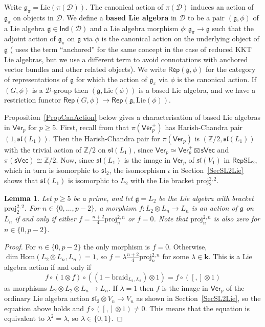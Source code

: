 \documentclass[11pt,a4paper,reqno]{amsart}
\newtheorem{lemma}[theorem]{Lemma}
\theoremstyle{definition}
\newcommand{\bk}{\mathbf{k}}
\newcommand{\cD}{\mathcal{D}}
\numberwithin{equation}{section}
\newcommand{\braid}{\mathrm{braid}}
\newcommand{\Ver}{\mathsf{Ver}}
\newcommand{\Rep}{\mathsf{Rep}}
\newcommand{\mZ}{\mathbb{Z}}
\newcommand{\fg}{\mathfrak{g}}
\newcommand{\fsl}{\mathfrak{sl}}
\newcommand{\Hom}{\mathrm{Hom}}
\newcommand{\Lie}{\mathrm{Lie}}
\newcommand{\sVec}{\mathsf{sVec}}
\newcommand{\Indd}{\mathsf{Ind}}
\newcommand{\SL}{\mathrm{SL}}
\newcommand{\proj}{\mathrm{proj}}
\begin{document}
Write $\fg_\pi=\Lie(\pi(\cD))$. The canonical action of $\pi(\cD)$ induces an action of $\fg_\pi$ on objects in $\cD$. We define a \textbf{based Lie algebra} in $\cD$ to be a pair $(\fg,\phi)$ of a Lie algebra $\fg\in\Indd(\cD)$ and a Lie algebra morphism $\phi:\fg_\pi\to\fg$ such that the adjoint action of $\fg_\pi$ on $\fg$ via $\phi$ is the canonical action on the underlying object of $\fg$ (\cite{EKO} uses the term ``anchored'' for the same concept in the case of reduced KKT Lie algebras, but we use a different term to avoid connotations with anchored vector bundles and other related objects). We write $\Rep(\fg,\phi)$ for the category of representations of $\fg$ for which the action of $\fg_\pi$ via $\phi$ is the canonical action. If $(G,\phi)$ is a $\cD$-group then $(\fg,\Lie(\phi))$ is a based Lie algebra, and we have a restriction functor $\Rep(G,\phi)\to\Rep(\fg,\Lie(\phi))$.

Proposition~\ref{PropCanAction} below gives a characterisation of based Lie algebras in $\Ver_p$ for $p\geq5$. First, recall from \cite[Theorem~4.9]{Ve2} that $\pi(\Ver_p^+)$ has Harish-Chandra pair $(1,\fsl(L_1))$. Then the Harish-Chandra pair for $\pi(\Ver_p)$ is $(\mZ/2,\fsl(L_1))$ with the trivial action of $\mZ/2$ on $\fsl(L_1)$, since $\Ver_p\simeq\Ver_p^+\boxtimes\sVec$ and $\pi(\sVec)\cong\mZ/2$. Now, since $\fsl(L_1)$ is the image in $\Ver_p$ of $\fsl(V_1)$ in $\Rep\SL_2$, which in turn is isomorphic to $\fsl_2$, the isomorphism $\iota$ in Section~\ref{SecSL2Lie} shows that $\fsl(L_1)$ is isomorphic to $L_2$ with the Lie bracket $\proj^{2,2}_2$.

\begin{lemma}\label{LemUniqueAction}
Let $p\geq5$ be a prime, and let $\fg=L_2$ be the Lie algebra with bracket $\proj^{2,2}_2$. For $n\in\{0,\dots,p-2\}$, a morphism $f:L_2\otimes L_n\to L_n$ is an action of $\fg$ on $L_n$ if and only if either $f=\frac{n+2}4\proj^{2,n}_n$ or $f=0$. Note that $\proj^{2,n}_n$ is also zero for $n\in\{0,p-2\}$.
\end{lemma}

\begin{proof}
For $n\in\{0,p-2\}$ the only morphism is $f=0$. Otherwise, $\dim\Hom(L_2\otimes L_n,L_n)=1$, so $f=\lambda\frac{n+2}4\proj^{2,n}_n$ for some $\lambda\in\bk$. This is a Lie algebra action if and only if
\[f\circ(1\otimes f)\circ((1-\braid_{L_2,L_2})\otimes1)=f\circ([,]\otimes1)\]
as morphisms $L_2\otimes L_2\otimes L_n\to L_n$. If $\lambda=1$ then $f$ is the image in $\Ver_p$ of the ordinary Lie algebra action $\fsl_2\otimes V_n\to V_n$ as shown in Section~\ref{SecSL2Lie}, so the equation above holds and $f\circ([,]\otimes1)\neq0$. This means that the equation is equivalent to $\lambda^2=\lambda$, so $\lambda\in\{0,1\}$.
\end{proof}
\end{document}
